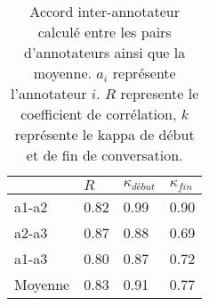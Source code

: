 \begin{table}[h]
    \centering
    \begin{tabular}{| p{2cm} | l | l l |}
    \hline
      & $R$ & $\kappa_{début}$ &$\kappa_{fin}$  \\
      \hline
      a1-a2   &0.82   &0.99   &0.90   \\
      a2-a3   &0.87   &0.88   &0.69   \\
      a1-a3   &0.80   &0.87   &0.72   \\
      \hline
      Moyenne &0.83   &0.91   &0.77   \\
      \hline
    \end{tabular}
    \caption{Accord inter-annotateur calculé entre les pairs d'annotateurs ainsi que la moyenne. $a_i$ représente l'annotateur $i$. $R$ represente le coefficient de corrélation, $k$ représente le kappa de début et de fin de conversation.}
    \label{tab:accordInterAnnot}
  \end{table}
